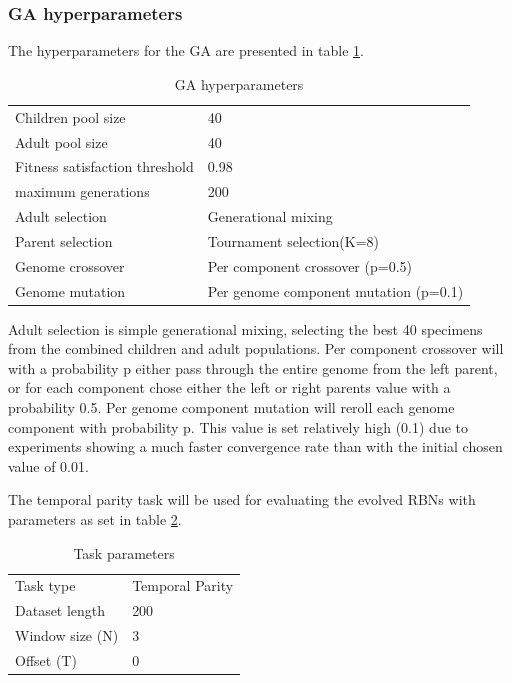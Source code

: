 \subsubsection{GA hyperparameters}

The hyperparameters for the GA are presented in table \ref{table:ga-hyperparameters}.

\begin{table}
  \centering
  \caption{GA hyperparameters}
  \label{table:ga-hyperparameters}
  \begin{tabular}{ll}
    Children pool size             & 40                                    \\
    Adult pool size                & 40                                    \\
    Fitness satisfaction threshold & 0.98                                  \\
    maximum generations            & 200                                   \\
    Adult selection                & Generational mixing                   \\
    Parent selection               & Tournament selection(K=8)             \\
    Genome crossover               & Per component crossover (p=0.5)       \\
    Genome mutation                & Per genome component mutation (p=0.1) \\
  \end{tabular}
\end{table}

Adult selection is simple generational mixing,
selecting the best 40 specimens from the combined children and adult populations.
Per component crossover will with a probability p either pass through the entire genome from the left parent,
or for each component chose either the left or right parents value with a probability 0.5.
Per genome component mutation will reroll each genome component with probability p.
This value is set relatively high (0.1) due to experiments showing a much faster convergence rate than with the initial chosen value of 0.01.

The temporal parity task will be used for evaluating the evolved RBNs with parameters as set in table \ref{table:dataset-parameters}.

\begin{table}
  \centering
  \caption{Task parameters}
  \label{table:dataset-parameters}
  \begin{tabular}{ll}
    Task type       & Temporal Parity \\
    Dataset length  & 200             \\
    Window size (N) & 3               \\
    Offset (T)      & 0               \\
  \end{tabular}
\end{table}

